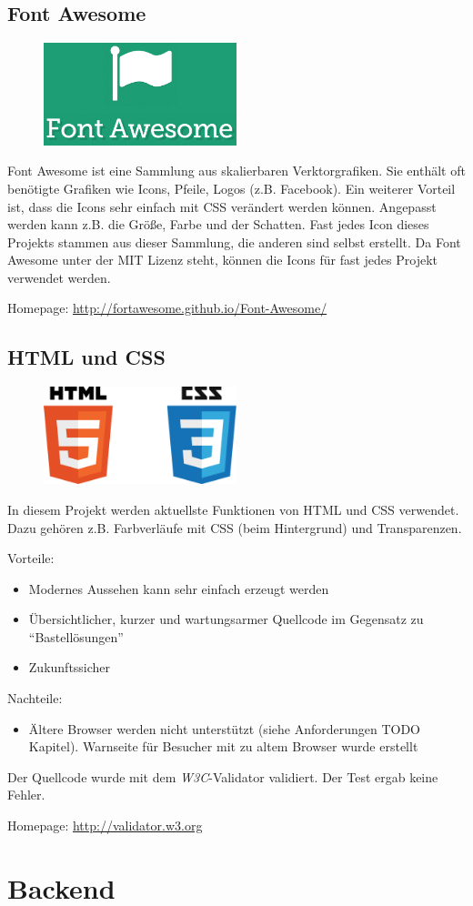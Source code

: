 \subsection{Font Awesome}
\begin{figure}[h]
  \centering
  \includegraphics[width=0.5\textwidth]{images/fontawesome_logo.png}
\end{figure}
Font Awesome ist eine Sammlung aus skalierbaren Verktorgrafiken. Sie enthält oft benötigte Grafiken wie Icons, Pfeile, Logos (z.B. Facebook). Ein weiterer Vorteil ist, dass die Icons sehr einfach mit CSS verändert werden können. Angepasst werden kann z.B. die Größe, Farbe und der Schatten. Fast jedes Icon dieses Projekts stammen aus dieser Sammlung, die anderen sind selbst erstellt. Da Font Awesome unter der MIT Lizenz steht, können die Icons für fast jedes Projekt verwendet werden.

Homepage: \url{http://fortawesome.github.io/Font-Awesome/}

\subsection{HTML und CSS}
\begin{figure}[h]
  \centering
  \includegraphics[width=0.5\textwidth]{images/html5_css_logo.pdf}
\end{figure}
In diesem Projekt werden aktuellste Funktionen von HTML und CSS verwendet. Dazu gehören z.B. Farbverläufe mit CSS (beim Hintergrund) und Transparenzen. 

Vorteile:
\begin{itemize}
	\item Modernes Aussehen kann sehr einfach erzeugt werden
	\item Übersichtlicher, kurzer und wartungsarmer Quellcode im Gegensatz zu ``Bastellösungen''
	\item Zukunftssicher
\end{itemize}
Nachteile:
\begin{itemize}
	\item Ältere Browser werden nicht unterstützt (siehe Anforderungen TODO Kapitel). Warnseite für Besucher mit zu altem Browser wurde erstellt
\end{itemize}

Der Quellcode wurde mit dem \textit{W3C}-Validator validiert. Der Test ergab keine Fehler.

Homepage: \url{http://validator.w3.org}

\section{Backend}